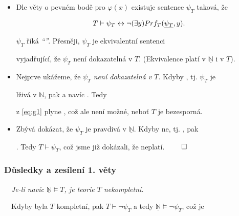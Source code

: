     \begin{itemize}
    \item Dle věty o pevném bodě pro $\varphi(x)$ existuje sentence $\psi_T$ taková, že
    
    \begin{equation}\label{eq:g1}
    {T\vdash \psi_T \leftrightarrow \neg (\exists y)Prf_T(\underline{\psi_T},y)}.
    \end{equation}
    
    
    $\psi_T$ říká {\it ``''}. Přesněji,  $\psi_T$ je ekvivalentní sentenci
    \smallskip
    
    vyjadřující, že $\psi_T$ není dokazatelná v $T$. (Ekvivalence platí v $\underline{\mathbb{N}}$ i v $T$).
    \smallskip
    
    \item Nejprve ukážeme, že {\it $\psi_T$ není dokazatelná v $T$}. Kdyby , tj. $\psi_T$ je
    \smallskip
    
    lživá v $\underline{\mathbb{N}}$, pak  a navíc
    . Tedy
    \smallskip
    
    z \eqref{eq:g1} plyne , což ale není možné, neboť $T$ je bezesporná.
    \smallskip
    
    \item Zbývá dokázat, že $\psi_T$ je pravdivá v $\underline{\mathbb{N}}$. Kdyby ne, tj. , pak
    \smallskip
    
    . Tedy $T \vdash \psi_T$, což jsme již dokázali, že neplatí. $\qed$
    \end{itemize}
    




\subsubsection*{Důsledky a zesílení 1. věty}
    \ \ {\it Je-li navíc $\underline{\mathbb{N}}\models T$, je teorie $T$ nekompletní.}
    \medskip
    
    \ \ Kdyby byla $T$ kompletní, pak $T\vdash \neg\psi_T$ a tedy $\underline{\mathbb{N}}\models \neg\psi_T$, což je
    \smallskip
    

